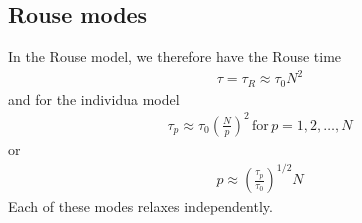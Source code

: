 \documentclass[letterpaper,10pt,english]{sphinxmanual}
\begin{document}
\subsection{Rouse modes}
\label{\detokenize{notebooks/L25/1_polymer_dynamics:Rouse-modes}}
\sphinxAtStartPar
In the Rouse model, we therefore have the Rouse time
\begin{equation*}
\begin{split}\tau=\tau_R\approx\tau_0 N^2\end{split}
\end{equation*}
\sphinxAtStartPar
and for the individua model
\begin{equation*}
\begin{split}\tau_p\approx \tau_0 \left ( \frac{N}{p}\right )^2\, \text{for}\, p=1,2,\ldots, N\end{split}
\end{equation*}
\sphinxAtStartPar
or
\begin{equation*}
\begin{split}p\approx \left( \frac{\tau_p}{\tau_0} \right )^{1/2} N\end{split}
\end{equation*}
\sphinxAtStartPar
Each of these modes relaxes independently.
\end{document}
